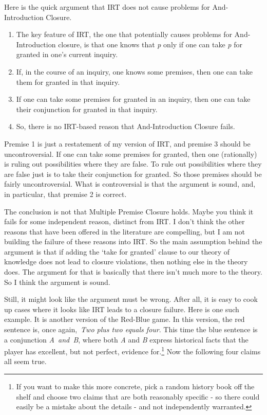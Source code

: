 \documentclass[
  10pt,
  letterpaper,
  twoside]{scrbook}
\providecommand{\tightlist}{%
  \setlength{\itemsep}{0pt}\setlength{\parskip}{0pt}}\usepackage{longtable,booktabs,array}
\begin{document}
Here is the quick argument that IRT does not cause problems for
And-Introduction Closure.

\begin{enumerate}
\def\labelenumi{\arabic{enumi}.}
\tightlist
\item
  The key feature of IRT, the one that potentially causes problems for
  And-Introduction closure, is that one knows that \emph{p} only if one
  can take \emph{p} for granted in one's current inquiry.
\item
  If, in the course of an inquiry, one knows some premises, then one can
  take them for granted in that inquiry.
\item
  If one can take some premises for granted in an inquiry, then one can
  take their conjunction for granted in that inquiry.
\item
  So, there is no IRT-based reason that And-Introduction Closure fails.
\end{enumerate}

Premise 1 is just a restatement of my version of IRT, and premise 3
should be uncontroversial. If one can take some premises for granted,
then one (rationally) is ruling out possibilities where they are false.
To rule out possibilities where they are false just is to take their
conjunction for granted. So those premises should be fairly
uncontroversial. What is controversial is that the argument is sound,
and, in particular, that premise 2 is correct.

The conclusion is not that Multiple Premise Closure holds. Maybe you
think it fails for some independent reason, distinct from IRT. I don't
think the other reasons that have been offered in the literature are
compelling, but I am not building the failure of these reasons into IRT.
So the main assumption behind the argument is that if adding the `take
for granted' clause to our theory of knowledge does not lead to closure
violations, then nothing else in the theory does. The argument for that
is basically that there isn't much more to the theory. So I think the
argument is sound.

Still, it might look like the argument must be wrong. After all, it is
easy to cook up cases where it looks like IRT leads to a closure
failure. Here is one such example. It is another version of the Red-Blue
game. In this version, the red sentence is, once again,~\emph{Two plus
two equals four}. This time the blue sentence is a conjunction
\emph{A~and~B}, where both \emph{A} and \emph{B} express historical
facts that the player has excellent, but not perfect, evidence
for.\footnote{If you want to make this more concrete, pick a random
  history book off the shelf and choose two claims that are both
  reasonably specific - so there could easily be a mistake about the
  details - and not independently warranted.} Now the following four
claims all seem true.
\end{document}
